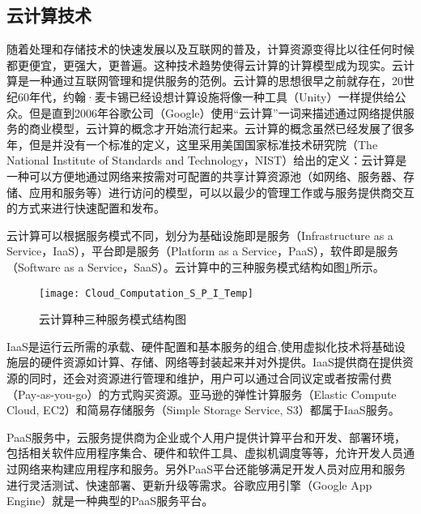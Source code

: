 \subsection{云计算技术}
随着处理和存储技术的快速发展以及互联网的普及，计算资源变得比以往任何时候都更便宜，更强大，更普遍。这种技术趋势使得云计算的计算模型成为现实。云计算是一种通过互联网管理和提供服务的范例\cite{zhang2010cloud,josep2010view}。云计算的思想很早之前就存在，20世纪60年代，约翰·麦卡锡已经设想计算设施将像一种工具（Unity）一样提供给公众\cite{parkhill1966challenge}。但是直到2006年谷歌公司（Google）使用“云计算”一词来描述通过网络提供服务的商业模型，云计算的概念才开始流行起来。云计算的概念虽然已经发展了很多年，但是并没有一个标准的定义\cite{sonnek2009virtual}，这里采用美国国家标准技术研究院（The National Institute of Standards and Technology，NIST）给出的定义\cite{zhang2010cloud}：云计算是一种可以方便地通过网络来按需对可配置的共享计算资源池（如网络、服务器、存储、应用和服务等）进行访问的模型，可以以最少的管理工作或与服务提供商交互的方式来进行快速配置和发布。

云计算可以根据服务模式不同，划分为基础设施即是服务（Infrastructure as a Service，IaaS），平台即是服务（Platform as a Service，PaaS），软件即是服务（Software as a Service，SaaS）\cite{林伟伟2012云计算资源调度研究综述,roman2018mobile}。云计算中的三种服务模式结构如图\ref{fig:cloud_computation_S_P_I}所示\cite{刘英男2011基于云计算框架的终端管理系统设计与实现}。

\begin{figure}[!htbp]
    \centering
    \texttt{[image: Cloud\_Computation\_S\_P\_I\_Temp]}
    \caption{云计算种三种服务模式结构图}
    \label{fig:cloud_computation_S_P_I}
\end{figure}

IaaS\cite{manvi2014resource, bhardwaj2010cloud}是运行云所需的承载、硬件配置和基本服务的组合,使用虚拟化技术将基础设施层的硬件资源如计算、存储、网络等封装起来并对外提供。IaaS提供商在提供资源的同时，还会对资源进行管理和维护，用户可以通过合同议定或者按需付费（Pay-as-you-go）的方式购买资源。亚马逊的弹性计算服务（Elastic Compute Cloud, EC2）和简易存储服务（Simple Storage Service, S3）都属于IaaS服务。

PaaS服务\cite{pahl2015containerization, hussain2018architectural}中，云服务提供商为企业或个人用户提供计算平台和开发、部署环境，包括相关软件应用程序集合、硬件和软件工具、虚拟机调度等等，允许开发人员通过网络来构建应用程序和服务。另外PaaS平台还能够满足开发人员对应用和服务进行灵活测试、快速部署、更新升级等需求。谷歌应用引擎（Google App Engine）就是一种典型的PaaS服务平台。

